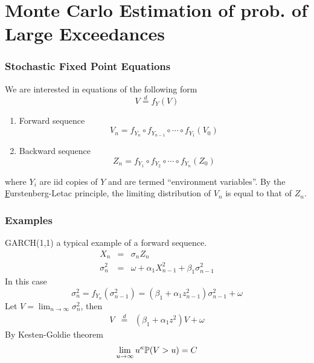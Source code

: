 \documentclass{beamer}
\begin{document}
\section{Monte Carlo Estimation of prob. of Large Exceedances}
\begin{frame}
  \frametitle{Stochastic Fixed Point Equations}
  We are interested in equations of the following form
  \[
  V \overset{d}{=} f_Y(V)
  \]
  \begin{enumerate}
  \item Forward sequence
    \[
    V_n = f_{Y_n} \circ f_{Y_{n-1}} \circ \cdots \circ f_{Y_1} (V_0)
    \]
    \item Backward sequence
      \[
      Z_n  = f_{Y_1} \circ f_{Y_{2}} \circ \cdots \circ f_{Y_n} (Z_0)
      \]
    \end{enumerate}
    where $Y_i$ are iid copies of $Y$ and are termed ``environment
    variables''.
    By the {\underline Furstenberg-Letac principle}, the limiting
    distribution of $V_n$ is equal to that of $Z_n$.
\end{frame}

\begin{frame}
  \frametitle{Examples}
    GARCH(1,1) a typical example of a forward sequence.
    \begin{eqnarray*}
      X_n &=& \sigma_n Z_n\\
      \sigma_n^2 &=& \omega + \alpha_1 X_{n-1}^2 + \beta_1 \sigma_{n-1}^2
    \end{eqnarray*}
    In this case
    \[
    \sigma_n^2 = f_{Y_n} (\sigma_{n-1}^2) =
    (\beta_1 + \alpha_1 z_{n-1}^2) \sigma_{n-1}^2
    + \omega
    \]
    Let $V = \lim_{n \to \infty} \sigma_n^2$, then
    \begin{eqnarray*}
      V &\overset{d}{=}& (\beta_1 + \alpha_1 z^2) V + \omega
    \end{eqnarray*}
    By Kesten-Goldie theorem
    \[
    \lim_{u \to \infty} u^{\kappa} \P(V > u) = C
    \]
\end{frame}
\end{document}
